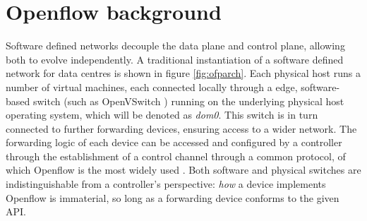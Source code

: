 \section{Openflow background}
\label{section:inflex:background}

Software defined networks decouple the data plane and control plane, allowing both to evolve independently.
A traditional instantiation of a software defined network for data centres is shown in figure \ref{fig:ofparch}.
Each physical host runs a number of virtual machines, each connected locally through a edge, software-based switch (such as OpenVSwitch \cite{openvswitch}) running on the underlying physical host operating system, which will be denoted as \emph{dom0}.
This switch is in turn connected to further forwarding devices, ensuring access to a wider network.
The forwarding logic of each device can be accessed and configured by a controller through the establishment of a control channel through a common protocol, of which Openflow is the most widely used \cite{McKeown:2008:OEI:1355734.1355746}.
Both software and physical switches are indistinguishable from a controller's perspective: \emph{how} a device implements Openflow is immaterial, so long as a forwarding device conforms to the given \ac{API}.


